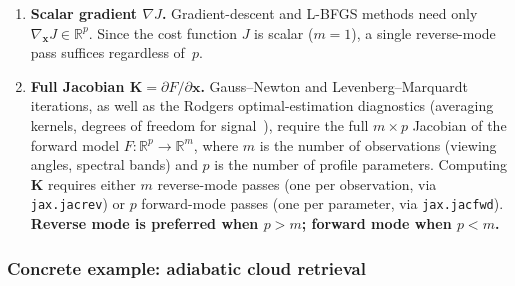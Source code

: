 \documentclass[11pt,a4paper]{article}
\newcommand{\R}{\mathbb{R}}
\newcommand{\vect}[1]{\bm{#1}}
\newcommand{\mat}[1]{\mathbf{#1}}
\theoremstyle{definition}
\begin{document}
\begin{enumerate}[nosep]
  \item \textbf{Scalar gradient $\nabla J$.}  Gradient-descent and
    L-BFGS methods need only $\nabla_{\!\vect{x}} J \in \R^p$.  Since
    the cost function $J$ is scalar ($m = 1$), a single reverse-mode
    pass suffices regardless of~$p$.

  \item \textbf{Full Jacobian $\mat{K} = \partial F / \partial \vect{x}$.}
    Gauss--Newton and Levenberg--Marquardt iterations, as well as the
    Rodgers optimal-estimation diagnostics (averaging kernels, degrees
    of freedom for signal~\cite{rodgers2000}), require the full
    $m \times p$ Jacobian of the forward model $F : \R^p \to \R^m$,
    where $m$ is the number of observations (viewing angles, spectral
    bands) and $p$ is the number of profile parameters.  Computing
    $\mat{K}$ requires either $m$ reverse-mode passes (one per
    observation, via \texttt{jax.jacrev}) or $p$ forward-mode passes
    (one per parameter, via \texttt{jax.jacfwd}).  \textbf{Reverse mode
    is preferred when $p > m$; forward mode when $p < m$.}
\end{enumerate}

\subsubsection{Concrete example: adiabatic cloud retrieval}
\end{document}
